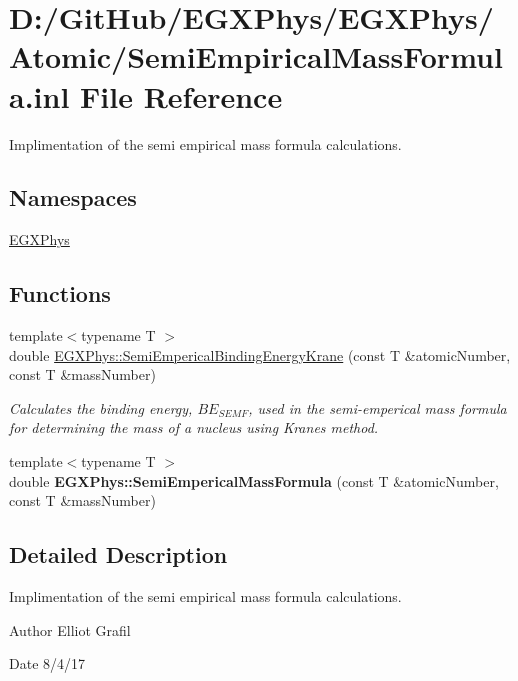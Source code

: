 \hypertarget{_semi_empirical_mass_formula_8inl}{}\section{D\+:/\+Git\+Hub/\+E\+G\+X\+Phys/\+E\+G\+X\+Phys/\+Atomic/\+Semi\+Empirical\+Mass\+Formula.inl File Reference}
\label{_semi_empirical_mass_formula_8inl}


Implimentation of the semi empirical mass formula calculations.  


\subsection*{Namespaces}
\begin{DoxyCompactItemize}
\item 
 \mbox{\hyperlink{namespace_e_g_x_phys}{E\+G\+X\+Phys}}
\end{DoxyCompactItemize}
\subsection*{Functions}
\begin{DoxyCompactItemize}
\item 
{\footnotesize template$<$typename T $>$ }\\double \mbox{\hyperlink{group___e_g_x_phys-_semi_empirical_mass_formula_ga99c5a87be2c76d3fa4852654c3fd59a9}{E\+G\+X\+Phys\+::\+Semi\+Emperical\+Binding\+Energy\+Krane}} (const T \&atomic\+Number, const T \&mass\+Number)
\begin{DoxyCompactList}\small\item\em Calculates the binding energy, $BE_{SEMF}$, used in the semi-\/emperical mass formula for determining the mass of a nucleus using Krane\textquotesingle{}s method. \end{DoxyCompactList}\item 
{\footnotesize template$<$typename T $>$ }\\double {\bfseries E\+G\+X\+Phys\+::\+Semi\+Emperical\+Mass\+Formula} (const T \&atomic\+Number, const T \&mass\+Number)
\end{DoxyCompactItemize}


\subsection{Detailed Description}
Implimentation of the semi empirical mass formula calculations. 

\begin{DoxyAuthor}{Author}
Elliot Grafil 
\end{DoxyAuthor}
\begin{DoxyDate}{Date}
8/4/17 
\end{DoxyDate}
